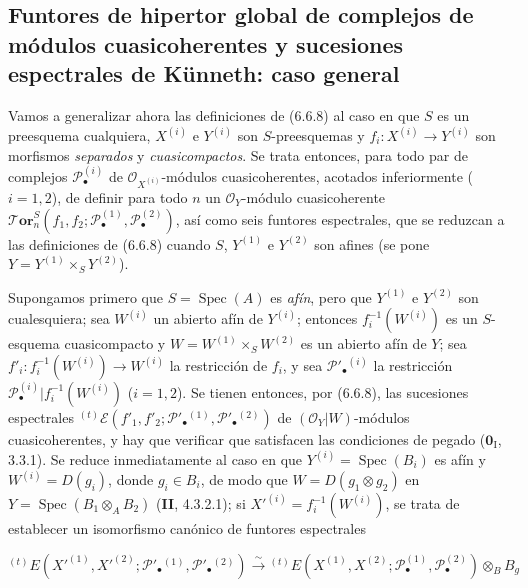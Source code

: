 \subsection{Funtores de hipertor global de complejos de módulos
cuasicoherentes y sucesiones espectrales de Künneth: caso general}
\label{subsection:III.6.7}

\begin{env}[6.7.1]
\label{III.6.7.1}
Vamos a generalizar ahora las definiciones de (6.6.8) al caso en que $S$ es
un preesquema cualquiera, $X^{(i)}$ e $Y^{(i)}$ son $S$-preesquemas y
$f_i:X^{(i)}\to Y^{(i)}$ son morfismos \emph{separados} y \emph{cuasicompactos}. Se
trata entonces, para todo par de complejos $\mathscr P_\bullet^{(i)}$ de
$\mathscr O_{X^{(i)}}$-módulos cuasicoherentes, acotados inferiormente
($i=1,2$), de definir para todo $n$ un $\mathscr O_Y$-módulo cuasicoherente
$\boldsymbol{\mathscr{T}\!or}_n^S
(f_1,f_2;\mathscr P_\bullet^{(1)},\mathscr P_\bullet^{(2)})$, así como seis
funtores espectrales, que se reduzcan a las definiciones de (6.6.8) cuando
$S$, $Y^{(1)}$ e $Y^{(2)}$ son afines (se pone
$Y=Y^{(1)}\times_S Y^{(2)}$).

Supongamos primero que $S=\operatorname{Spec}(A)$ es \emph{afín}, pero que
$Y^{(1)}$ e $Y^{(2)}$ son cualesquiera; sea $W^{(i)}$ un abierto afín de
$Y^{(i)}$; entonces $f_i^{-1}(W^{(i)})$ es un $S$-esquema cuasicompacto y
$W=W^{(1)}\times_S W^{(2)}$ es un abierto afín de $Y$; sea
$f'_i:f_i^{-1}(W^{(i)})\to W^{(i)}$ la restricción de $f_i$, y sea
$\mathscr P'_\bullet{}^{(i)}$ la restricción
$\mathscr P_\bullet^{(i)}|f_i^{-1}(W^{(i)})$ ($i=1,2$). Se tienen entonces,
por (6.6.8), las sucesiones espectrales
${}^{(t)}\mathscr E
(f'_1,f'_2;\mathscr P'_\bullet{}^{(1)},\mathscr P'_\bullet{}^{(2)})$
de $(\mathscr O_Y|W)$-módulos cuasicoherentes, y hay que verificar que
satisfacen las condiciones de pegado ($\mathbf{0}_{\mathrm I}$, 3.3.1).
Se reduce inmediatamente al caso en que
$Y^{(i)}=\operatorname{Spec}(B_i)$ es afín y $W^{(i)}=D(g_i)$, donde
$g_i\in B_i$, de modo que
$W=D(g_1\otimes g_2)$
en $Y=\operatorname{Spec}(B_1\otimes_A B_2)$ (\textbf{II}, 4.3.2.1); si
$X'^{(i)}=f_i^{-1}(W^{(i)})$, se trata de establecer un isomorfismo canónico
de funtores espectrales

\label{III.6.7.1.1}
\[
  {}^{(t)}E
  (X'^{(1)},X'^{(2)};
   \mathscr P'_\bullet{}^{(1)},\mathscr P'_\bullet{}^{(2)})
  \xrightarrow{\sim}
  {}^{(t)}E
  (X^{(1)},X^{(2)};
   \mathscr P_\bullet^{(1)},\mathscr P_\bullet^{(2)})
  \otimes_B B_g
  \tag{6.7.1.1}\label{III.6.7.1.1.fr}
\]



\end{env}
